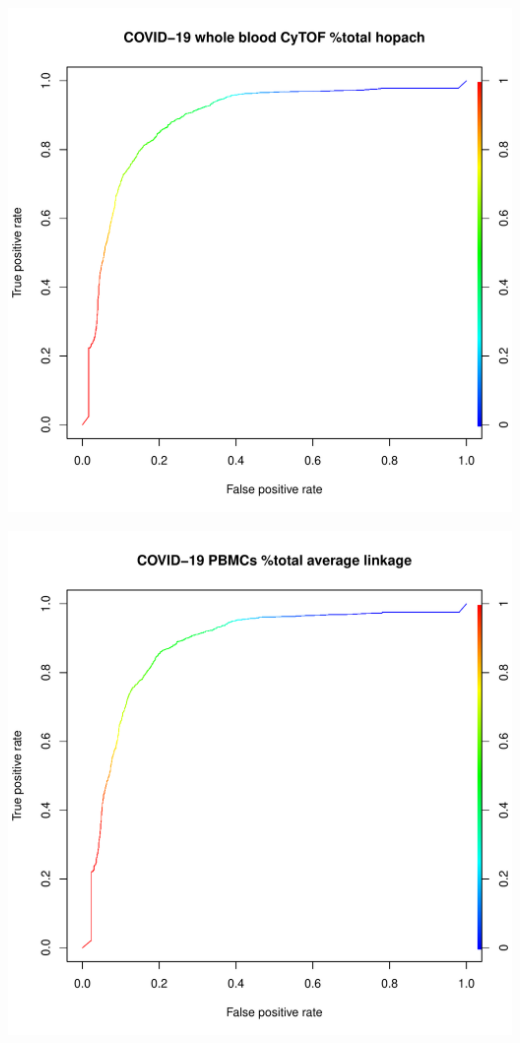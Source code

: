 \documentclass[11pt,a4paper,twoside]{report}\usepackage[]{graphicx}\usepackage[]{color}
\makeatletter
\def\maxwidth{ %
  \ifdim\Gin@nat@width>\linewidth
    \linewidth
  \else
    \Gin@nat@width
  \fi
}
\newenvironment{knitrout}{}{} %
\makeatother
\begin{document}
\begin{knitrout}
\includegraphics[width=\maxwidth]{figure/fig_code-7} 

\includegraphics[width=\maxwidth]{figure/fig_code-8} 


\end{knitrout}
\end{document}
